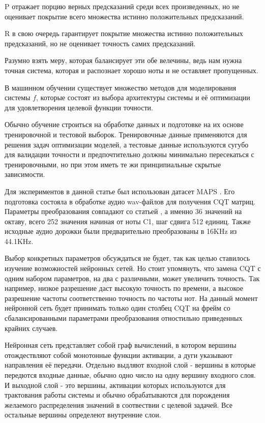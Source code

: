 P отражает порцию верных предсказаний среди всех произведенных, но не оценивает
покрытие всего множества истинно положительных предсказаний.

R в свою очередь гарантирует покрытие множества истинно положительных
предсказаний, но не оценивает точность самих предсказаний.

Разумно взять меру, которая балансирует эти обе велечины, ведь нам нужна
точная система, которая и распознает хорошо ноты и не оставляет пропущенных.

В машинном обучении существует множество методов для моделирования системы
$f$, которые состоят из выбора архитектуры системы и её оптимизации
для удовлетворения целевой функции точности.

Обычно обучение строиться на обработке данных и подготовке на их основе
тренировочной и тестовой выборок. Тренировочные данные применяются
для решения задач оптимизации моделей, а тестовые данные используются сугубо
для валидации точности и предпочтительно должны минимально пересекаться
с тренировочными, но при этом иметь те жи принципиальные скрытые зависимости.

Для экспериментов в данной статье был использован датасет MAPS \cite{L:MAPS}.
Его подготовка состояла в обработке аудио wav-файлов для получения
CQT матриц. Параметры преобразования совпадают со статьей \cite{SBETENN},
а именно 36 значений на октаву, всего 252 значения начиная от ноты C1,
шаг сдвига 512 единиц. Также исходные аудио дорожки были предварительно
преобразованы в 16KHz из 44.1KHz.

Выбор конкретных параметров обсуждаться не будет, так как целью ставилось
изучение возможностей нейронных сетей. Но стоит упомянуть, что замена
CQT с одним набором параметров, на два с различными, может увеличить точность.
Так например, низкое разрешение даст высокую точность по времени,
а высокое разрешение частоты соответственно точность по частоты нот.
На данный момент нейронной сеть будет принимать только один столбец CQT на
фрейм со сбалансированными параметрами преобразования отностильно приведенных
крайних случаев.

Нейронная сеть представляет собой граф вычислений, в котором вершины
отождествляют собой монотонные функции активации, а дуги указывают
направления её передачи. Отдельно выдляют входной слой - вершины
в которые передются входные данные, обычно одно число на одну вершину
входного слоя. И выходной слой - это вершины, активации которых используются
для трактования работы системы и обычно обрабатываются для порождения
желаемого распределения значений в соотвествии с целевой задачей.
Все остальные вершины определеют внутренние слои.

